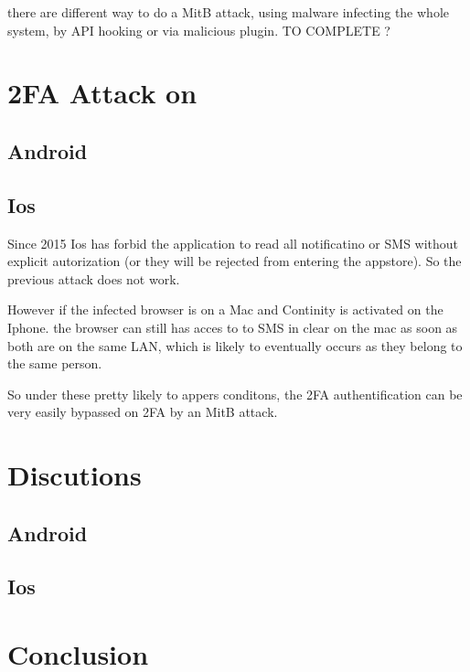 \documentclass[11pt]{article}
\begin{document}
there are different way to do a MitB attack, using malware infecting the whole 
system, by API hooking or via malicious plugin. TO COMPLETE ?
\section{2FA Attack on }
\subsection{Android}
\subsection{Ios}
Since 2015 Ios has forbid the application to read all 
notificatino or SMS without explicit autorization (or they will be rejected from entering the appstore). So 
the previous attack does not work. 

However if the infected browser is on a Mac and Continity 
is activated on the Iphone. the browser can still has acces to to SMS in clear 
on the mac as soon as both are on the same LAN, which is likely to eventually occurs
as they belong to the same person. 

So under these pretty likely to appers conditons, the 2FA authentification can 
be very easily bypassed on 2FA by an MitB attack.


\section{Discutions} 
\subsection{Android}
\subsection{Ios}
\section{Conclusion}

 
%
\end{document}
